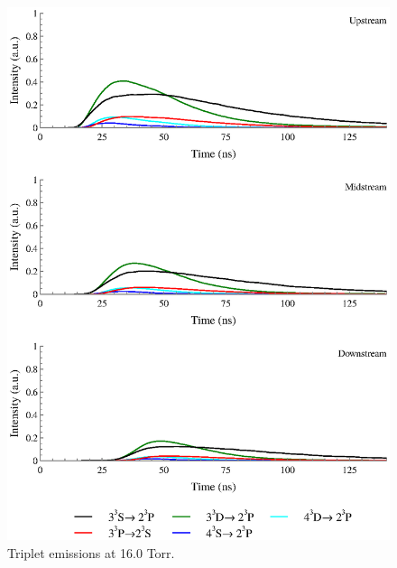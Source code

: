 \begin{figure}
  \centering
  \includegraphics{./chapters/extraem/figures/16torr_t.eps}
  \caption{Triplet emissions at 16.0 Torr.}
\end{figure}
